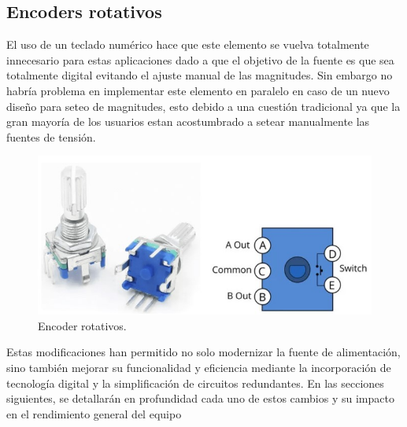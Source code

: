 \subsection{Encoders rotativos}
El uso de un teclado numérico hace que este elemento se vuelva totalmente innecesario para estas aplicaciones dado a que el objetivo de la fuente es que sea totalmente digital evitando el ajuste manual de las magnitudes. Sin embargo no habría problema en implementar este elemento en paralelo en caso de un nuevo diseño para seteo de magnitudes, esto debido a una cuestión tradicional ya que la gran mayoría de los usuarios estan acostumbrado a setear manualmente las fuentes de tensión. 
\begin{figure}[H]
    \centering
    \includegraphics[scale=0.5]{./imagenes/encoder_rotativo.jpg}
    \caption{Encoder rotativos.}
    \label{F:encoder_rotativo}
\end{figure}

Estas modificaciones han permitido no solo modernizar la fuente de alimentación, sino también mejorar su funcionalidad y eficiencia mediante la incorporación de tecnología digital y la simplificación de circuitos redundantes. En las secciones siguientes, se detallarán en profundidad cada uno de estos cambios y su impacto en el rendimiento general del equipo





